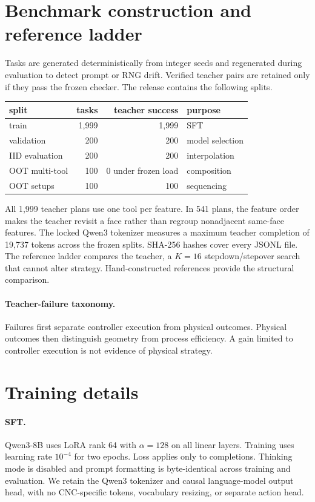 \documentclass{article}
\begin{document}
\section{Benchmark construction and reference ladder}
\label{app:benchmark}

Tasks are generated deterministically from integer seeds and regenerated
during evaluation to detect prompt or RNG drift.  Verified teacher pairs
are retained only if they pass the frozen checker.  The release contains
the following splits.
\begin{center}
\begin{tabular}{lrrl}
\toprule
split & tasks & teacher success & purpose\\
\midrule
train & 1,999 & 1,999 & SFT\\
validation & 200 & 200 & model selection\\
IID evaluation & 200 & 200 & interpolation\\
OOT multi-tool & 100 & 0 under frozen load & composition\\
OOT setups & 100 & 100 & sequencing\\
\bottomrule
\end{tabular}
\end{center}
All 1,999 teacher plans use one tool per feature.  In 541 plans, the
feature order makes the teacher revisit a face rather than regroup
nonadjacent same-face features.
The locked Qwen3 tokenizer measures a maximum teacher completion of
19,737 tokens across the frozen splits.  SHA-256 hashes cover every
JSONL file.  The reference ladder compares the teacher, a $K{=}16$
stepdown/stepover search that cannot alter strategy.  Hand-constructed
references provide the structural comparison.

\paragraph{Teacher-failure taxonomy.}
Failures first separate controller execution from physical outcomes.
Physical outcomes then distinguish geometry from process efficiency.
A gain limited to controller execution is not evidence of physical
strategy.

\section{Training details}
\label{app:full}

\paragraph{SFT.}
Qwen3-8B uses LoRA rank 64 with $\alpha=128$ on all linear layers.
Training uses learning rate $10^{-4}$ for two epochs.  Loss applies only
to completions.  Thinking mode is
disabled and prompt formatting is byte-identical across training and
evaluation. We retain the Qwen3 tokenizer and causal language-model
output head, with no CNC-specific tokens, vocabulary resizing, or
separate action head.
\end{document}
